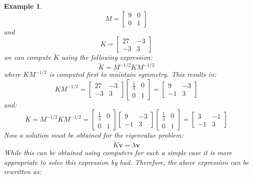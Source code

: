 \documentclass[12pt,letter]{article}
\newtheorem{ex}{Example}
\numberwithin{ex}{section} %
\newenvironment{example}{\begin{mdframed}[middlelinewidth=0.5mm]\begin{ex}\normalfont}{\end{ex}\end{mdframed}}
\numberwithin{re}{section} %
\begin{document}
\begin{example}
\begin{equation}
	M = \begin{bmatrix} 9 & 0 \\  0  & 1 \end{bmatrix} 
\end{equation}
and 
\begin{equation}
	 K = \begin{bmatrix} 27 & -3 \\    -3  & 3 \end{bmatrix}
\end{equation}
we can compute  $\widetilde{K}$ using the following expression:
\begin{equation}
	 \widetilde{K}=M^{-1/2}KM^{-1/2}
\end{equation}
where $KM^{-1/2}$ is computed first to maintain symmetry. This results in:
\begin{equation}
	 KM^{-1/2} =  \begin{bmatrix} 27 & -3 \\    -3  & 3 \end{bmatrix}  \begin{bmatrix} \frac{1}{3} & 0 \\    0  & 1 \end{bmatrix}= \begin{bmatrix} 9 & -3 \\    -1  & 3 \end{bmatrix}
\end{equation}
and:
\begin{equation}
	  \widetilde{K}=M^{-1/2}KM^{-1/2} =  \begin{bmatrix} \frac{1}{3} & 0 \\    0  & 1 \end{bmatrix} \begin{bmatrix} 9 & -3 \\    -1  & 3 \end{bmatrix} \begin{bmatrix} \frac{1}{3} & 0 \\    0  & 1 \end{bmatrix} =  \begin{bmatrix} 3 & -1\\  -1  & 3 \end{bmatrix} 
\end{equation}
Now a solution must be obtained for the eigenvalue problem:
\begin{equation}
\widetilde{K}\textbf{v} =  \lambda \textbf{v}
\end{equation}
While this can be obtained using computers for such a simple case it is more appropriate to solve this expression by had. Therefore, the above expression can be rewritten as:

\end{example}
\end{document}
